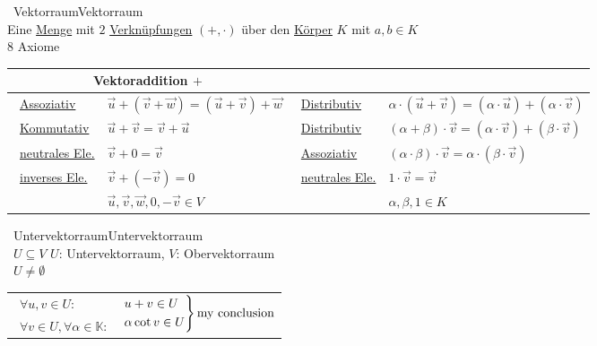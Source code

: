 		\begin{proposition}{\currentboxsection \ Vektorraum}{Vektorraum} \label{vektorraum}  \\
			Eine \hyperref[menge]{Menge} mit $2$ \hyperref[verknuepfung]{Verknüpfungen} $(+,\cdot)$ über den \hyperref[koerper]{Körper} $K$ mit $a,b \in K$ \\
			8 Axiome \\
			\begin{tabular}{|m{2.5cm}|>{\centering\arraybackslash}m{3.6cm}|m{2.5cm}|>{\centering\arraybackslash}m{4.6cm}|}
				\hline
				\multicolumn{2}{|c|}{Vektoraddition $+$} & \multicolumn{2}{c|}{Skalarmultiplication $\cdot$} \\
				\hline
				\textbullet \ \hyperref[assoziativ]{Assoziativ} & $\vec{u} + (\vec{v} + \vec{w}) = (\vec{u} + \vec{v}) + \vec{w}$ & \textbullet \ \hyperref[distributiv]{Distributiv} & $\alpha \cdot (\vec{u} + \vec{v}) = (\alpha \cdot \vec{u}) + (\alpha \cdot \vec{v})$ \\
				\textbullet \ \hyperref[kommutativ]{Kommutativ}  & $\vec{u} + \vec{v} = \vec{v} + \vec{u}$ & \textbullet \ \hyperref[distributiv]{Distributiv} & $(\alpha + \beta) \cdot \vec{v} = (\alpha \cdot \vec{v}) + (\beta \cdot \vec{v})$ \\
				\textbullet \ \hyperref[neutral_element]{neutrales Ele.}  & $\vec{v} + 0 = \vec{v}$ & \textbullet \ \hyperref[assoziativ]{Assoziativ} & $(\alpha \cdot \beta) \cdot \vec{v} = \alpha \cdot (\beta \cdot \vec{v})$ \\
				\textbullet \ \hyperref[invers_element]{inverses Ele.}  & $\vec{v} + (-\vec{v}) = 0$ & \textbullet \ \hyperref[neutral_element]{neutrales Ele.} & $1 \cdot \vec{v} = \vec{v}$ \\
				& $\vec{u}, \vec{v}, \vec{w}, 0, -\vec{v} \in V$ & & $\alpha , \beta , 1 \in K$ \\
				\hline
			\end{tabular}
		\end{proposition}
		
		\begin{proposition}{\currentboxsection \ Untervektorraum}{Untervektorraum} \label{untervektorraum}  \\
			\textbullet\ $U \subseteq V$ \hspace{6cm} $U$: Untervektorraum, $V$: Obervektorraum\\
			\textbullet\ $U \neq \emptyset$	\vspace{3pt} \\
			\begin{tabular}{@{}ll@{}}
				\textbullet\ $\forall u,v \in U:$ & \multirow{2}{*}{
					$
					\begin{rcases}
						u+v \in U \\
						\alpha \cot v \in U
					\end{rcases}
					\text{my conclusion}
					$
				} \\
				\textbullet\ $\forall v \in U, \forall \alpha \in \mathbb{K}:$ & \\
			\end{tabular}	
		\end{proposition}
		
